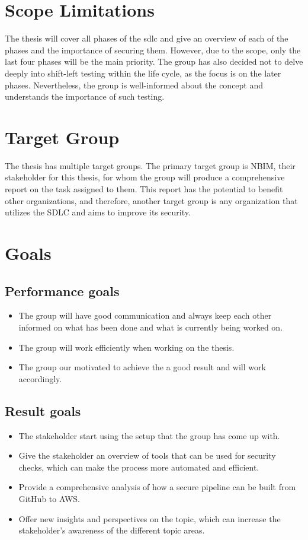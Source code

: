  
\section{Scope Limitations}
The thesis will cover all phases of the \acrlong{sdlc} and give an overview of each of the phases and the importance of securing them.  However, due to the scope, only the last four phases will be the main priority. 
The group has also decided not to delve deeply into \gls{shift-left} testing within the life cycle, as the focus is on the later phases. Nevertheless, the group is well-informed about the concept and understands the importance of such testing. 


\section{Target Group}
The thesis has multiple target groups. The primary target group is NBIM, their stakeholder for this thesis, for whom the group will produce a comprehensive report on the task assigned to them. This report has the potential to benefit other organizations, and therefore, another target group is any organization that utilizes the SDLC and aims to improve its security.

\section{Goals}
\subsection{Performance goals}
\begin{itemize}
    \item The group will have good communication and always keep each other informed on what has been done and what is currently being worked on. 
    \item The group will work efficiently when working on the thesis. 
    \item The group our motivated to achieve the a good result and will work accordingly. 
\end{itemize}

\subsection{Result goals}
\begin{itemize}
    \item The stakeholder start using the setup that the group has come up with. 
    \item Give the stakeholder an overview of tools that can be used for security checks, which can make the process more automated and efficient. 
    \item Provide a comprehensive analysis of how a secure pipeline can be built from GitHub to AWS. 
    \item Offer new insights and perspectives on the topic, which can increase the stakeholder's awareness of the different topic areas. 
\end{itemize}

